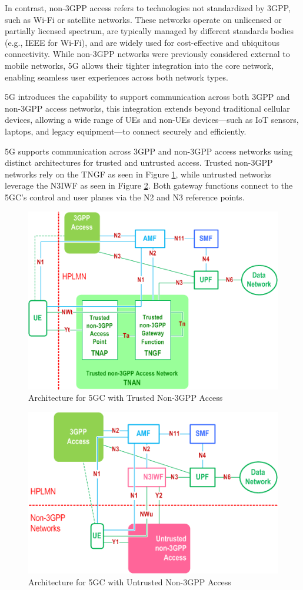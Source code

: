 In contrast, non-\ac{3GPP} access refers to technologies not standardized by \ac{3GPP}, such as Wi-Fi or satellite networks. These networks operate on unlicensed or partially licensed spectrum, are typically managed by different standards bodies (e.g., IEEE for Wi-Fi), and are widely used for cost-effective and ubiquitous connectivity. While non-\ac{3GPP} networks were previously considered external to mobile networks, \ac{5G} allows their tighter integration into the core network, enabling seamless user experiences across both network types. %

\ac{5G} introduces the capability to support communication across both \ac{3GPP} and non-\ac{3GPP} access networks, this integration extends beyond traditional cellular devices, allowing a wide range of \acp{UE} and non-\acp{UE} devices—such as \ac{IoT} sensors, laptops, and legacy equipment—to connect securely and efficiently.

5G supports communication across \ac{3GPP} and non-\ac{3GPP} access networks using distinct architectures for trusted and untrusted access. Trusted non-\ac{3GPP} networks rely on the \ac{TNGF} as seen in Figure \ref{fig:architecture-for-5g-core-network-with-trusted-non-3gpp-access}, while untrusted networks leverage the \ac{N3IWF} as seen in Figure \ref{fig:architecture-for-5g-core-network-with-untrusted-non-3gpp-access}. Both gateway functions connect to the \ac{5GC}’s control and user planes via the N2 and N3 reference points.

\begin{figure}
    \centering
    \includegraphics[width=0.5\linewidth]{figs/architecture-for-5g-core-network-with-trusted-non-3gpp-access.png}
    \caption{Architecture for \acl{5GC} with Trusted Non-\ac{3GPP} Access}
    \label{fig:architecture-for-5g-core-network-with-trusted-non-3gpp-access}
\end{figure}

\begin{figure}
    \centering
    \includegraphics[width=0.5\linewidth]{figs/architecture-for-5g-core-network-with-untrusted-non-3gpp-access.png}
    \caption{Architecture for \acl{5GC} with Untrusted Non-\ac{3GPP} Access}
    \label{fig:architecture-for-5g-core-network-with-untrusted-non-3gpp-access}
\end{figure}

